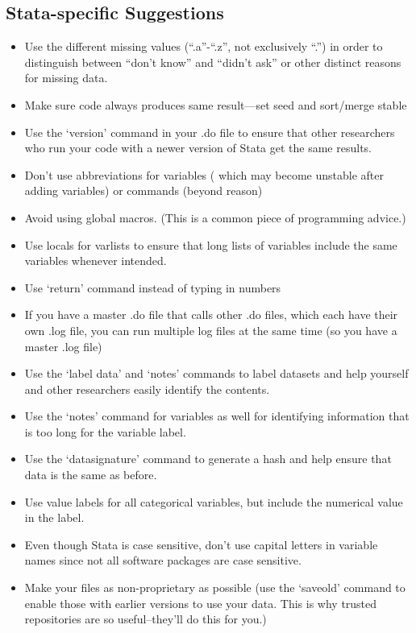\documentclass[12pt] {article}
\begin{document}
\subsection{Stata-specific
Suggestions}\label{stata-specific-suggestions}

\begin{itemize}
\item
  Use the different missing values (``.a''-``.z'', not exclusively
  ``.'') in order to distinguish between ``don't know'' and ``didn't ask'' or other distinct reasons for missing data.
\item
  Make sure code always produces same result---set seed and sort/merge
  stable
\item
  Use the `version' command in your .do file to ensure that other researchers who run your code with a newer version of Stata get the same results. 
\item
  Don't use abbreviations for variables ( which may become unstable after
  adding variables) or commands (beyond reason)
\item
  Avoid using global macros. (This is a common piece of programming advice.)
\item
  Use locals for varlists to ensure that long lists of variables include the same variables whenever intended.
\item
  Use `return' command instead of typing in numbers
\item
  If you have a master .do file that calls other .do files, which each have their own .log file, you can run
  multiple log files at the same time (so you have a master .log file)
\item
  Use the `label data' and `notes' commands to label datasets and help yourself and other researchers easily identify the contents.
\item
  Use the `notes' command for variables as well for identifying information that is too long for the variable label.
\item
  Use the `datasignature' command to generate a hash and help ensure that data is
  the same as before.
\item
  Use value labels for all categorical variables, but include the
  numerical value in the label.
\item
  Even though Stata is case sensitive, don't use capital letters in variable names since not all software packages
  are case sensitive.
\item
  Make your files as non-proprietary as possible (use the `saveold'
  command to enable those with earlier versions to use your data. This
  is why trusted repositories are so useful--they'll do this for you.)
\end{itemize}
\end{document}
